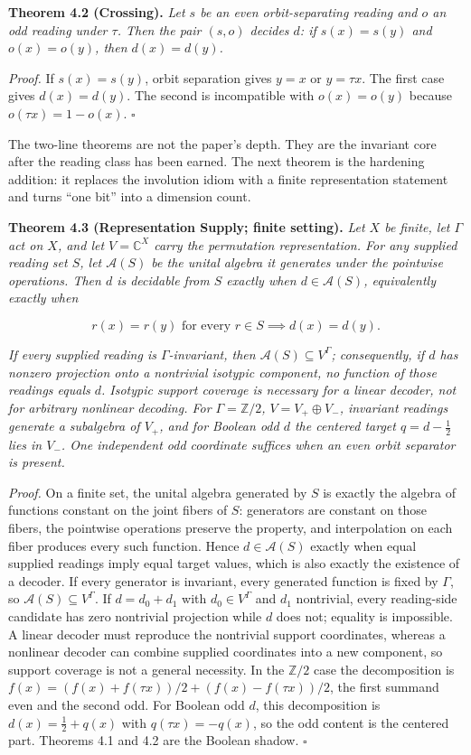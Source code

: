 \documentclass[10pt,twocolumn]{article}
\begin{document}
\textbf{Theorem 4.2 (Crossing).} \emph{Let \(s\) be an even
orbit-separating reading and \(o\) an odd reading under \(\tau\). Then
the pair \((s, o)\) decides \(d\): if \(s(x) = s(y)\) and
\(o(x) = o(y)\), then \(d(x) = d(y)\).}

\emph{Proof.} If \(s(x) = s(y)\), orbit separation gives \(y = x\) or
\(y = \tau x\). The first case gives \(d(x) = d(y)\). The second is
incompatible with \(o(x) = o(y)\) because \(o(\tau x) = 1 - o(x)\).
\(\square\)

The two-line theorems are not the paper's depth. They are the invariant
core after the reading class has been earned. The next theorem is the
hardening addition: it replaces the involution idiom with a finite
representation statement and turns ``one bit'' into a dimension count.

\textbf{Theorem 4.3 (Representation Supply; finite setting).} \emph{Let
\(X\) be finite, let \(\Gamma\) act on \(X\), and let
\(V = \mathbb{C}^X\) carry the permutation representation. For any
supplied reading set \(S\), let \(\mathcal{A}(S)\) be the unital algebra
it generates under the pointwise operations. Then \(d\) is decidable
from \(S\) exactly when \(d \in \mathcal{A}(S)\), equivalently exactly
when}

\[r(x) = r(y) \text{ for every } r \in S \implies d(x) = d(y).\]

\emph{If every supplied reading is \(\Gamma\)-invariant, then
\(\mathcal{A}(S) \subseteq V^\Gamma\); consequently, if \(d\) has
nonzero projection onto a nontrivial isotypic component, no function of
those readings equals \(d\). Isotypic support coverage is necessary for
a linear decoder, not for arbitrary nonlinear decoding. For
\(\Gamma = \mathbb{Z}/2\), \(V = V_+ \oplus V_-\), invariant readings
generate a subalgebra of \(V_+\), and for Boolean odd \(d\) the centered
target \(q = d - \tfrac{1}{2}\) lies in \(V_-\). One independent odd
coordinate suffices when an even orbit separator is present.}

\emph{Proof.} On a finite set, the unital algebra generated by \(S\) is
exactly the algebra of functions constant on the joint fibers of \(S\):
generators are constant on those fibers, the pointwise operations
preserve the property, and interpolation on each fiber produces every
such function. Hence \(d \in \mathcal{A}(S)\) exactly when equal
supplied readings imply equal target values, which is also exactly the
existence of a decoder. If every generator is invariant, every generated
function is fixed by \(\Gamma\), so
\(\mathcal{A}(S) \subseteq V^\Gamma\). If \(d = d_0 + d_1\) with
\(d_0 \in V^\Gamma\) and \(d_1\) nontrivial, every reading-side
candidate has zero nontrivial projection while \(d\) does not; equality
is impossible. A linear decoder must reproduce the nontrivial support
coordinates, whereas a nonlinear decoder can combine supplied
coordinates into a new component, so support coverage is not a general
necessity. In the \(\mathbb{Z}/2\) case the decomposition is
\(f(x) = (f(x) + f(\tau x))/2 + (f(x) - f(\tau x))/2\), the first
summand even and the second odd. For Boolean odd \(d\), this
decomposition is \(d(x) = \tfrac{1}{2} + q(x)\) with
\(q(\tau x) = -q(x)\), so the odd content is the centered part. Theorems
4.1 and 4.2 are the Boolean shadow. \(\square\)
\end{document}
